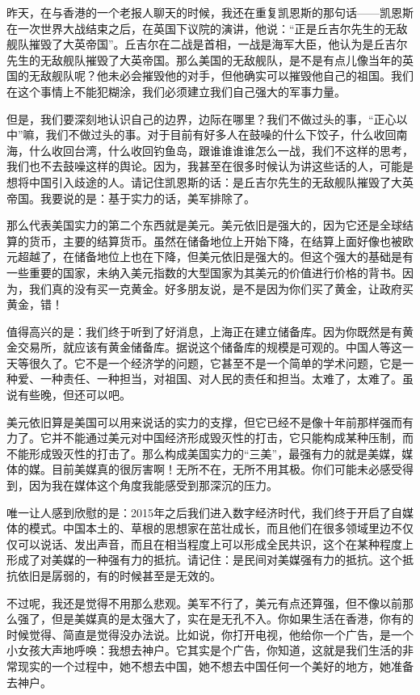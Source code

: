 \documentclass[UTF8, 12pt, a4paper]{ctexrep}
\begin{document}
昨天，在与香港的一个老报人聊天的时候，我还在重复凯恩斯的那句话——凯恩斯在一次世界大战结束之后，在英国下议院的演讲，他说：“正是丘吉尔先生的无敌舰队摧毁了大英帝国”。丘吉尔在二战是首相，一战是海军大臣，他认为是丘吉尔先生的无敌舰队摧毁了大英帝国。那么美国的无敌舰队，是不是有点儿像当年的英国的无敌舰队呢？他未必会摧毁他的对手，但他确实可以摧毁他自己的祖国。我们在这个事情上不能犯糊涂，我们必须建立我们自己强大的军事力量。

但是，我们要深刻地认识自己的边界，边际在哪里？我们不做过头的事，“正心以中”嘛，我们不做过头的事。对于目前有好多人在鼓噪的什么下饺子，什么收回南海，什么收回台湾，什么收回钓鱼岛，跟谁谁谁谁怎么一战，我们不这样的思考，我们也不去鼓噪这样的舆论。因为，我甚至在很多时候认为讲这些话的人，可能是想将中国引入歧途的人。请记住凯恩斯的话：是丘吉尔先生的无敌舰队摧毁了大英帝国。我要说的是：基于实力的话，美军排除了。

那么代表美国实力的第二个东西就是美元。美元依旧是强大的，因为它还是全球结算的货币，主要的结算货币。虽然在储备地位上开始下降，在结算上面好像也被欧元超越了，在储备地位上也在下降，但美元依旧是强大的。但这个强大的基础是有一些重要的国家，未纳入美元指数的大型国家为其美元的价值进行价格的背书。因为，我们真的没有买一克黄金。好多朋友说，是不是因为你们买了黄金，让政府买黄金，错！

值得高兴的是：我们终于听到了好消息，上海正在建立储备库。因为你既然是有黄金交易所，就应该有黄金储备库。据说这个储备库的规模是可观的。中国人等这一天等很久了。它不是一个经济学的问题，它甚至不是一个简单的学术问题，它是一种爱、一种责任、一种担当，对祖国、对人民的责任和担当。太难了，太难了。虽说有些晚，但还可以吧。

美元依旧算是美国可以用来说话的实力的支撑，但它已经不是像十年前那样强而有力了。它并不能通过美元对中国经济形成毁灭性的打击，它只能构成某种压制，而不能形成毁灭性的打击了。那么构成美国实力的“三美”，最强有力的就是美媒，媒体的媒。目前美媒真的很厉害啊！无所不在，无所不用其极。你们可能未必感受得到，因为我在媒体这个角度我能感受到那深沉的压力。

唯一让人感到欣慰的是：2015年之后我们进入数字经济时代，我们终于开启了自媒体的模式。中国本土的、草根的思想家在茁壮成长，而且他们在很多领域里边不仅仅可以说话、发出声音，而且在相当程度上可以形成全民共识，这个在某种程度上形成了对美媒的一种强有力的抵抗。请记住：是民间对美媒强有力的抵抗。这个抵抗依旧是孱弱的，有的时候甚至是无效的。

不过呢，我还是觉得不用那么悲观。美军不行了，美元有点还算强，但不像以前那么强了，但是美媒真的是太强大了，实在是无孔不入。你如果生活在香港，你有的时候觉得、简直是觉得没办法说。比如说，你打开电视，他给你一个广告，是一个小女孩大声地呼唤：我想去神户。它其实是个广告，你知道，这就是我们生活的非常现实的一个过程中，她不想去中国，她不想去中国任何一个美好的地方，她准备去神户。
\end{document}
